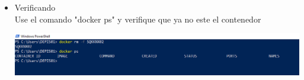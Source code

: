 \begin{itemize}
	\item Verificando
	\\ Use el comando "docker ps" y verifique que ya no este el contenedor

	\begin{center}
	\includegraphics[width=15cm]{./Imagenes/22} 
	\end{center}

\end{itemize} 

